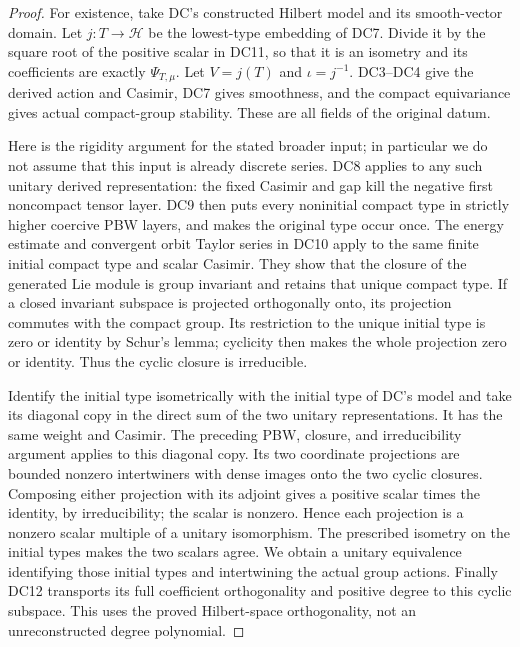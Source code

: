\begin{proof}
For existence, take DC's constructed Hilbert model and its smooth-vector
domain.  Let $j:T\to\mathcal H$ be the lowest-type embedding of DC7.
Divide it by the square root of the positive scalar in DC11, so that
it is an isometry and its coefficients are exactly $\Psi_{T,\mu}$.
Let $V=j(T)$ and $\iota=j^{-1}$.  DC3--DC4 give the derived action and
Casimir, DC7 gives smoothness, and the compact equivariance gives actual
compact-group stability.  These are all fields of the original datum.

Here is the rigidity argument for the stated broader input; in
particular we do not assume that this input is already discrete series.
DC8 applies to any such unitary derived representation: the fixed
Casimir and gap kill the negative first noncompact tensor layer.
DC9 then puts every noninitial compact type in strictly higher
coercive PBW layers, and makes the original type occur once.
The energy estimate and convergent orbit Taylor series in DC10 apply to
the same finite initial compact type and scalar Casimir.  They show that
the closure of the generated Lie module is group invariant and retains
that unique compact type.  If a closed invariant subspace is projected
orthogonally onto, its projection commutes with the compact group.
Its restriction to the unique initial type is zero or identity by
Schur's lemma; cyclicity then makes the whole projection zero or
identity.  Thus the cyclic closure is irreducible.

Identify the initial type isometrically with the initial type of DC's
model and take its diagonal copy in the direct sum of the two unitary
representations.  It has the same weight and Casimir.  The preceding
PBW, closure, and irreducibility argument applies to this diagonal copy.
Its two coordinate projections are bounded nonzero intertwiners with
dense images onto the two cyclic closures.  Composing either projection
with its adjoint gives a positive scalar times the identity, by
irreducibility; the scalar is nonzero.  Hence each projection is a
nonzero scalar multiple of a unitary isomorphism.  The prescribed
isometry on the initial types makes the two scalars agree.  We obtain
a unitary equivalence identifying those initial types and intertwining
the actual group actions.
Finally DC12 transports its full coefficient orthogonality and positive
degree to this cyclic subspace.  This uses the proved Hilbert-space
orthogonality, not an unreconstructed degree polynomial.
\end{proof}

